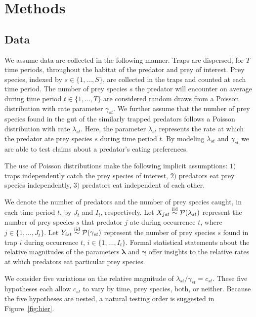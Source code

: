 \section{Methods}
\label{sec:methods}

\subsection{Data}

We assume data are collected in the following manner.  Traps are dispersed, for $T$ time periods, throughout the habitat of the predator and prey of interest.  Prey species, indexed by $s \in \{1, \ldots, S \}$, are collected in the traps and counted at each time period.  The number of prey species $s$ the predator will encounter on average during time period $t \in \{1, \ldots, T\}$ are considered random draws from a Poisson distribution with rate parameter $\gamma_{st}$.  We further assume that the number of prey species found in the gut of the similarly trapped predators follows a Poisson distribution with rate $\lambda_{st}$.  Here, the parameter $\lambda_{st}$ represents the rate at which the predator ate prey species $s$ during time period $t$.  By modeling $\lambda_{st}$ and $\gamma_{st}$ we are able to test claims about a predator's eating preferences.  

The use of Poisson distributions make the following implicit assumptions: $1)$ traps independently catch the prey species of interest, $2)$ predators eat prey species independently, $3)$ predators eat independent of each other.

We denote the number of predators and the number of prey species caught, in each time period $t$, by $J_t$ and $I_t$, respectively.  Let $X_{jst} \stackrel{\mathrm{iid}}{\sim} \mathcal{P}(\lambda_{st})$ represent the number of prey species $s$ that predator $j$ ate during occurrence $t$, where $j \in \{1, \ldots, J_t\}$.  Let $Y_{ist} \stackrel{\mathrm{iid}}{\sim} \mathcal{P}(\gamma_{st})$ represent the number of prey species $s$ found in trap $i$ during occurrence $t$, $i \in \{1, \ldots, I_t\}$.  Formal statistical statements about the relative magnitudes of the parameters $\boldsymbol{\lambda}$ and $\boldsymbol{\gamma}$ offer insights to the relative rates at which predators eat particular prey species.  

We consider five variations on the relative magnitude of $\lambda_{st}/\gamma_{st} = c_{st}$.  These five hypotheses each allow $c_{st}$ to vary by time, prey species, both, or neither.  Because the five hypotheses are nested, a natural testing order is suggested in Figure~\ref{fig:hier}.

